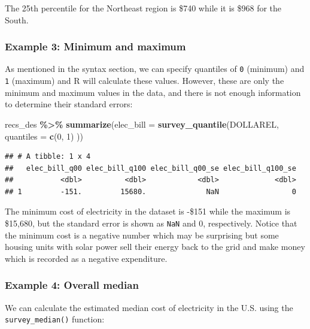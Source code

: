 \documentclass[
]{krantz}
\makeatletter
\newenvironment{Shaded}{\begin{snugshade}}{\end{snugshade}}
\newcommand{\AttributeTok}[1]{\textcolor[rgb]{0.27,0.27,0.27}{#1}}
\newcommand{\DecValTok}[1]{\textcolor[rgb]{0.06,0.06,0.06}{#1}}
\newcommand{\FunctionTok}[1]{\textcolor[rgb]{0.27,0.27,0.27}{\textbf{#1}}}
\newcommand{\NormalTok}[1]{#1}
\newcommand{\SpecialCharTok}[1]{\textcolor[rgb]{0.43,0.43,0.43}{\textbf{#1}}}
\newenvironment{kframe}{%
\medskip{}
\setlength{\fboxsep}{.8em}
 \def\at@end@of@kframe{}%
 \ifinner\ifhmode%
  \def\at@end@of@kframe{\end{minipage}}%
  \begin{minipage}{\columnwidth}%
 \fi\fi%
 \def\FrameCommand##1{\hskip\@totalleftmargin \hskip-\fboxsep
 \colorbox{shadecolor}{##1}\hskip-\fboxsep
     \hskip-\linewidth \hskip-\@totalleftmargin \hskip\columnwidth}%
 \MakeFramed {\advance\hsize-\width
   \@totalleftmargin\z@ \linewidth\hsize
   \@setminipage}}%
 {\par\unskip\endMakeFramed%
 \at@end@of@kframe}
\renewenvironment{Shaded}{\begin{kframe}}{\end{kframe}}
\makeatother
\begin{document}
The 25th percentile for the Northeast region is \$740 while it is \$968 for the South.

\hypertarget{example-3-minimum-and-maximum}{%
\subsubsection*{Example 3: Minimum and maximum}\label{example-3-minimum-and-maximum}}


As mentioned in the syntax section, we can specify quantiles of \texttt{0} (minimum) and \texttt{1} (maximum) and R will calculate these values. However, these are only the minimum and maximum values in the data, and there is not enough information to determine their standard errors:

\begin{Shaded}
\begin{Highlighting}[]
\NormalTok{recs\_des }\SpecialCharTok{\%\textgreater{}\%}
  \FunctionTok{summarize}\NormalTok{(}\AttributeTok{elec\_bill =} \FunctionTok{survey\_quantile}\NormalTok{(DOLLAREL,}
    \AttributeTok{quantiles =} \FunctionTok{c}\NormalTok{(}\DecValTok{0}\NormalTok{, }\DecValTok{1}\NormalTok{)}
\NormalTok{  ))}
\end{Highlighting}
\end{Shaded}

\begin{verbatim}
## # A tibble: 1 x 4
##   elec_bill_q00 elec_bill_q100 elec_bill_q00_se elec_bill_q100_se
##           <dbl>          <dbl>            <dbl>             <dbl>
## 1         -151.         15680.              NaN                 0
\end{verbatim}

The minimum cost of electricity in the dataset is -\$151 while the maximum is \$15,680, but the standard error is shown as \texttt{NaN} and 0, respectively. Notice that the minimum cost is a negative number which may be surprising but some housing units with solar power sell their energy back to the grid and make money which is recorded as a negative expenditure.

\hypertarget{example-4-overall-median}{%
\subsubsection*{Example 4: Overall median}\label{example-4-overall-median}}


We can calculate the estimated median cost of electricity in the U.S. using the \texttt{survey\_median()} function:
\end{document}
